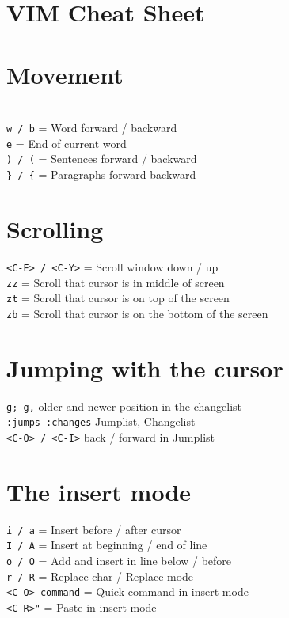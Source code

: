 \documentclass[10pt,DIV=50,landscape,pagesize,parskip=off]{scrartcl}
\newcommand\co[1]{\texttt{#1}}
\newcommand\coe[2]{\co{#1} = #2}
\begin{document}
\section*{{\Huge {}VIM Cheat Sheet}}
\begin{multicols}{3}
\section{Movement}
\\
\coe{w / b}{Word forward / backward}\\
\coe{e}{End of current word}\\
\coe{) / (}{Sentences forward / backward}\\
\coe{\} / \{}{Paragraphs forward backward}

\section{Scrolling}
\coe{<C-E> / <C-Y>}{Scroll window down / up}\\
\coe{zz}{Scroll that cursor is in middle of screen}\\
\coe{zt}{Scroll that cursor is on top of the screen}\\
\coe{zb}{Scroll that cursor is on the bottom of the screen}

\section{Jumping with the cursor}
\lstinline|g; g,| older and newer position in the changelist \\
\lstinline|:jumps :changes| Jumplist, Changelist\\
\lstinline|<C-O> / <C-I>| back / forward in Jumplist


\section{The insert mode}
\coe{i / a}{Insert before / after cursor}\\
\coe{I / A}{Insert at beginning / end of line}\\
\coe{o / O}{Add and insert in line below / before}\\
\coe{r / R}{Replace char / Replace mode} \\
\lstinline|<C-O> command| = Quick command in insert mode \\
\lstinline|<C-R>"| = Paste in insert mode


\end{multicols}
\end{document}
